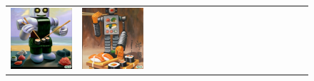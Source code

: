 \begin{figure}[ht!]
\begin{adjustwidth}{-0.8in}{-0.5in}
\begin{tabular}{cccccccccccccccccccc}
\multicolumn{2}{c}{\includegraphics[width=\threebythreecolwidth\textwidth]{figures/cherries/sushi_robot_3.jpg}} &
\multicolumn{2}{c}{\includegraphics[width=\threebythreecolwidth\textwidth]{figures/cherries/sushi_robot_4.jpg}} &

\end{tabular}
\end{adjustwidth}
\end{figure}
